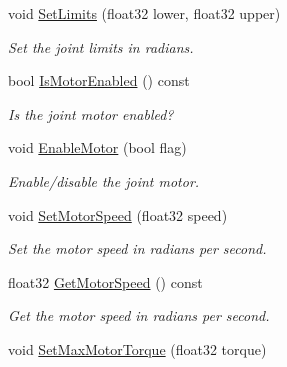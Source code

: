 \begin{DoxyCompactItemize}
void \hyperlink{classb2RevoluteJoint_a32f9393d8a6b993fd523f0f643c28107}{Set\+Limits} (float32 lower, float32 upper)
\begin{DoxyCompactList}\small\item\em Set the joint limits in radians. \end{DoxyCompactList}\item 
\mbox{\label{classb2RevoluteJoint_a37d5744e89991ebe01b974c4d15a21b5}} 
bool \hyperlink{classb2RevoluteJoint_a37d5744e89991ebe01b974c4d15a21b5}{Is\+Motor\+Enabled} () const
\begin{DoxyCompactList}\small\item\em Is the joint motor enabled? \end{DoxyCompactList}\item 
\mbox{\label{classb2RevoluteJoint_a80ed5a07d9a0e07d010808a73ffae6ff}} 
void \hyperlink{classb2RevoluteJoint_a80ed5a07d9a0e07d010808a73ffae6ff}{Enable\+Motor} (bool flag)
\begin{DoxyCompactList}\small\item\em Enable/disable the joint motor. \end{DoxyCompactList}\item 
\mbox{\label{classb2RevoluteJoint_a56f60bb1ea69048c8a455da49d62bf65}} 
void \hyperlink{classb2RevoluteJoint_a56f60bb1ea69048c8a455da49d62bf65}{Set\+Motor\+Speed} (float32 speed)
\begin{DoxyCompactList}\small\item\em Set the motor speed in radians per second. \end{DoxyCompactList}\item 
\mbox{\label{classb2RevoluteJoint_abb1fa43d5779a1164ddfedf6130d7ff2}} 
float32 \hyperlink{classb2RevoluteJoint_abb1fa43d5779a1164ddfedf6130d7ff2}{Get\+Motor\+Speed} () const
\begin{DoxyCompactList}\small\item\em Get the motor speed in radians per second. \end{DoxyCompactList}\item 
\mbox{\label{classb2RevoluteJoint_a41779d7ec05be33e6368ef00123a3581}} 
void \hyperlink{classb2RevoluteJoint_a41779d7ec05be33e6368ef00123a3581}{Set\+Max\+Motor\+Torque} (float32 torque)

\end{DoxyCompactItemize}
